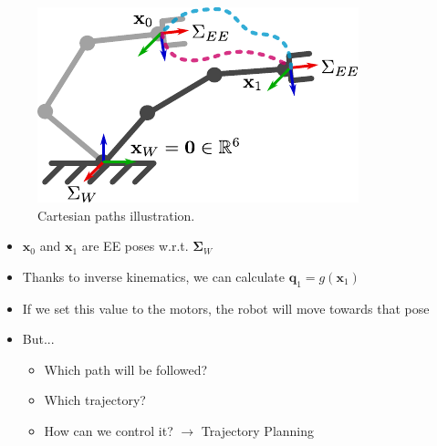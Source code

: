 \documentclass[10pt, aspectratio=169]{beamer}
\theoremstyle{remark}
\theoremstyle{definition}
\begin{document}
\begin{frame}[allowframebreaks]
\begin{itemize}
	\end{itemize}

    \framebreak

    \begin{center}
    \begin{minipage}{.45\linewidth}
    \begin{figure}
            \centering
            \includegraphics{images/manipulator_path.pdf}
            \caption{Cartesian paths illustration.}
    \end{figure}
    \end{minipage}%
    \begin{minipage}{.6\linewidth}
    \begin{itemize}
        \item $\mathbf{x}_0$ and $\mathbf{x}_1$ are EE poses w.r.t. $\mathbf{\Sigma}_W$
        \item Thanks to inverse kinematics, we can calculate $\mathbf{q}_1 = g(\mathbf{x}_1)$ 
        \item If we set this value to the motors, the robot will move towards that pose
        \item But...
        \begin{itemize}
            \item Which path will be followed?
            \item Which trajectory? 
            \item How can we control it? $\rightarrow$ Trajectory Planning
        \end{itemize}
    \end{itemize}
    \end{minipage}
    \end{center}


\end{frame}
\end{document}
